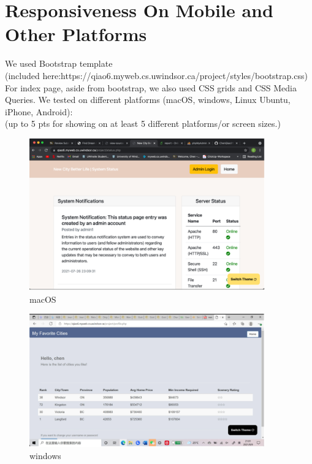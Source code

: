 \documentclass[12pt, letterpaper]{article}
\begin{document}
 \newpage

\section{Responsiveness On Mobile and Other Platforms}

We used Bootstrap template \\(included here:https://qiao6.myweb.cs.uwindsor.ca/project/styles/bootstrap.css) 
\\For index page, aside from bootstrap, we also used CSS grids and CSS Media Queries. 
We tested on different platforms (macOS, windows, Linux Ubuntu, iPhone, Android):
\\(up to 5 pts for showing on at least 5 different platforms/or screen sizes.)

\begin{figure}[htbp]
	\centering
	\includegraphics[width=4in]{images/q12-macOS.png}
	\caption{macOS}
 \end{figure}
 
 \begin{figure}[htbp]
	\centering
	\includegraphics[width=4in]{images/q12-windows.png}
	\caption{windows}
 \end{figure}
\end{document}
